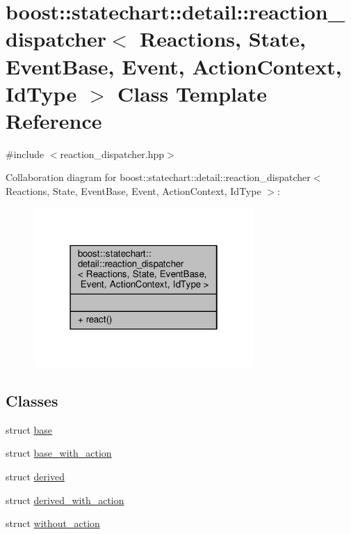 \hypertarget{classboost_1_1statechart_1_1detail_1_1reaction__dispatcher}{}\section{boost\+:\+:statechart\+:\+:detail\+:\+:reaction\+\_\+dispatcher$<$ Reactions, State, Event\+Base, Event, Action\+Context, Id\+Type $>$ Class Template Reference}
\label{classboost_1_1statechart_1_1detail_1_1reaction__dispatcher}


{\ttfamily \#include $<$reaction\+\_\+dispatcher.\+hpp$>$}



Collaboration diagram for boost\+:\+:statechart\+:\+:detail\+:\+:reaction\+\_\+dispatcher$<$ Reactions, State, Event\+Base, Event, Action\+Context, Id\+Type $>$\+:
\nopagebreak
\begin{figure}[H]
\begin{center}
\leavevmode
\includegraphics[width=238pt]{classboost_1_1statechart_1_1detail_1_1reaction__dispatcher__coll__graph}
\end{center}
\end{figure}
\subsection*{Classes}
\begin{DoxyCompactItemize}
\item 
struct \mbox{\hyperlink{structboost_1_1statechart_1_1detail_1_1reaction__dispatcher_1_1base}{base}}
\item 
struct \mbox{\hyperlink{structboost_1_1statechart_1_1detail_1_1reaction__dispatcher_1_1base__with__action}{base\+\_\+with\+\_\+action}}
\item 
struct \mbox{\hyperlink{structboost_1_1statechart_1_1detail_1_1reaction__dispatcher_1_1derived}{derived}}
\item 
struct \mbox{\hyperlink{structboost_1_1statechart_1_1detail_1_1reaction__dispatcher_1_1derived__with__action}{derived\+\_\+with\+\_\+action}}
\item 
struct \mbox{\hyperlink{structboost_1_1statechart_1_1detail_1_1reaction__dispatcher_1_1without__action}{without\+\_\+action}}
\end{DoxyCompactItemize}
